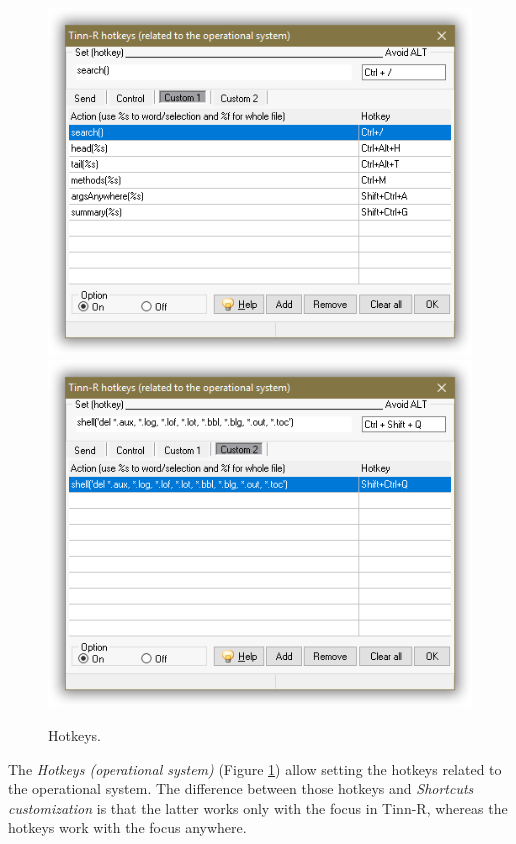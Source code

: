 \begin{figure}[h!]
  \includegraphics[scale=0.45]{./res/hotkeys_custom_1.png}
  \includegraphics[scale=0.45]{./res/hotkeys_custom_2.png}
  \caption{Hotkeys.}
  \label{fig:hotkeys}
\end{figure}

The \textit{Hotkeys (operational system)}
(Figure \ref{fig:hotkeys})
allow setting the hotkeys
related to the operational system. The difference between those hotkeys and
\textit{Shortcuts customization} is that the latter works only with the
focus in Tinn-R, whereas the hotkeys work with the focus anywhere.

